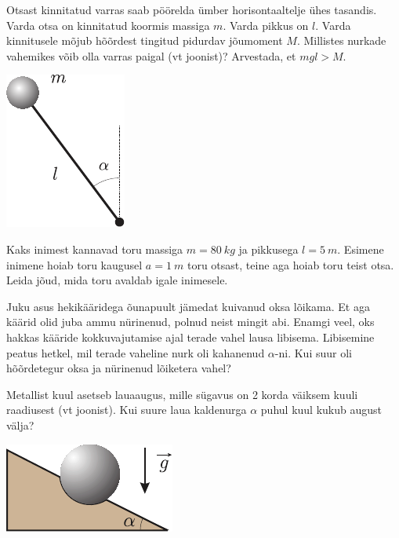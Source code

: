 \documentclass[10pt]{article}
\begin{document}
{
Otsast kinnitatud varras saab pöörelda ümber horisontaaltelje ühes tasandis. Varda otsa on kinnitatud koormis massiga $m$. Varda pikkus on $l$. Varda kinnitusele mõjub hõõrdest tingitud pidurdav jõumoment $M$. Millistes nurkade vahemikes võib olla varras paigal (vt joonist)? Arvestada, et $mgl > M$.
\begin{center}
	\includegraphics[width=0.3\linewidth]{2008-v2g-01-yl}
\end{center}
\probend
\bigskip


Kaks inimest kannavad toru massiga $m = \SI{80}{kg}$ ja pikkusega $l = \SI{5}{m}$. Esimene inimene hoiab toru kaugusel $a = \SI{1}{m}$ toru otsast, teine aga hoiab toru teist otsa. Leida jõud, mida toru avaldab igale inimesele.
\probend
\bigskip


Juku asus hekikääridega õunapuult jämedat kuivanud oksa lõikama. Et aga käärid olid juba ammu nürinenud, polnud neist mingit abi. Enamgi veel, oks hakkas kääride kokkuvajutamise ajal terade vahel lausa libisema. Libisemine peatus hetkel, mil terade vaheline nurk oli kahanenud $\alpha$-ni. Kui suur oli hõõrdetegur oksa ja nürinenud lõiketera vahel?
\probend
\bigskip


Metallist kuul asetseb lauaaugus, mille sügavus on 2 korda väiksem kuuli raadiusest (vt joonist). Kui suure laua kaldenurga $\alpha$ puhul kuul kukub august välja? 

\begin{center}
	\includegraphics[width=0.4\linewidth]{2005-lahg-03-yl}
\end{center}
\probend
\bigskip

}
\end{document}
